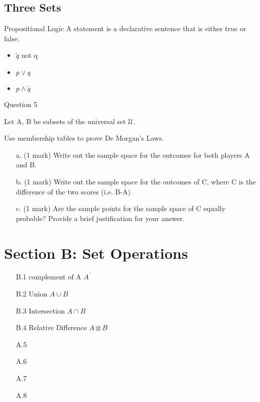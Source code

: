 \documentclass[]{report}
\begin{document}
\subsection*{ Three Sets }






Propositional Logic A statement is a declarative sentence that
is either true or false.
\begin{itemize}
	\item $\tilde q$ not q \item $p \vee q$ \item $p \wedge \tilde
	q$
\end{itemize}




Question 5


Let A, B be subsets of the universal set $\mathcal{U}$.

Use membership tables to prove De Morgan's Laws.


%
%
%


\begin{itemize}
	\item[a.] (1 mark) Write out the sample space for the outcomes for both players A and B.
	\item[b.] (1 mark) Write out the sample space for the outcomes of C, where C is the difference of the two scores (i.e. B-A)
	\item[c.] (1 mark) Are the sample points for the sample space of C equally probable? Provide a brief justification for your answer.
\end{itemize}

\newpage
\section*{Section B: Set Operations}
\begin{itemize}
	\item[B.1] complement of A $A^{\prime}$
	\item[B.2] Union $A \cup B$
	\item[B.3] Intersection $A \cap B$
	\item[B.4] Relative Difference $A \otimes B$
	\item[A.5]
	\item[A.6]
	\item[A.7]
	\item[A.8]
\end{itemize}
\newpage
\end{document}
